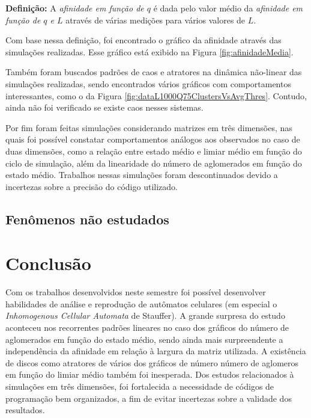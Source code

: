 \documentclass[
	12pt,				%
	openright,			%
	twoside,			%
	a4paper,			%
	english,			%
	french,				%
	spanish,			%
	brazil				%
	]{abntex2}
\begin{document}
\textbf{Definição:} A \textit{afinidade em função de $q$} é dada pelo valor médio da \textit{afinidade em função de $q$ e $L$} através de várias medições para vários valores de $L$.

Com base nessa definição, foi encontrado o gráfico da afinidade através das simulações realizadas. Esse gráfico está exibido na Figura \ref{fig:afinidadeMedia}.

Também foram buscados padrões de caos e atratores na dinâmica não-linear das simulações realizadas, sendo encontrados vários gráficos com comportamentos interessantes, como o da Figura \ref{fig:dataL1000Q75ClustersVsAvgThres}. Contudo, ainda não foi verificado se existe caos nesses sistemas.

Por fim foram feitas simulações considerando matrizes em três dimensões, nas quais foi possível constatar comportamentos análogos aos observados no caso de duas dimensões, como a relação entre estado médio e limiar médio em função do ciclo de simulação, além da linearidade do número de aglomerados em função do estado médio. Trabalhos nessas simulações foram descontinuados devido a incertezas sobre a precisão do código utilizado.

\section{Fenômenos não estudados}


\chapter{Conclusão}

Com os trabalhos desenvolvidos neste semestre foi possível desenvolver habilidades de análise e reprodução de autômatos celulares (em especial o \textit{Inhomogenous Cellular Automata} de Stauffer). A grande surpresa do estudo aconteceu nos recorrentes padrões lineares no caso dos gráficos do número de aglomerados em função do estado médio, sendo ainda mais surpreendente a independência da afinidade em relação à largura da matriz utilizada. A existência de discos como atratores de vários dos gráficos de número número de aglomeros em função do limiar médio também foi inesperada. Dos estudos relacionados à simulações em três dimensões, foi fortalecida a necessidade de códigos de programação bem organizados, a fim de evitar incertezas sobre a validade dos resultados.
\end{document}
